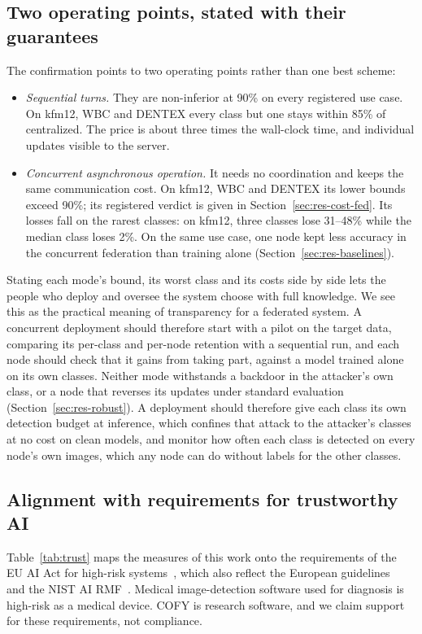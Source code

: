 \documentclass[pdflatex,sn-mathphys-num]{sn-jnl}
\newcommand{\sys}{COFY}
\begin{document}
\subsection{Two operating points, stated with their guarantees}
The confirmation points to two operating points rather than one best scheme:
\begin{itemize}
\item \emph{Sequential turns.} They are non-inferior at 90\% on every registered use case. On kfm12, WBC and DENTEX every class but one stays within 85\% of centralized. The price is about three times the wall-clock time, and individual updates visible to the server.
\item \emph{Concurrent asynchronous operation.} It needs no coordination and keeps the same communication cost. On kfm12, WBC and DENTEX its lower bounds exceed 90\%; its registered verdict is given in Section~\ref{sec:res-cost-fed}. Its losses fall on the rarest classes: on kfm12, three classes lose 31--48\% while the median class loses 2\%. On the same use case, one node kept less accuracy in the concurrent federation than training alone (Section~\ref{sec:res-baselines}).
\end{itemize}
Stating each mode's bound, its worst class and its costs side by side lets the people who deploy and oversee the system choose with full knowledge. We see this as the practical meaning of transparency for a federated system. A concurrent deployment should therefore start with a pilot on the target data, comparing its per-class and per-node retention with a sequential run, and each node should check that it gains from taking part, against a model trained alone on its own classes. Neither mode withstands a backdoor in the attacker's own class, or a node that reverses its updates under standard evaluation (Section~\ref{sec:res-robust}). A deployment should therefore give each class its own detection budget at inference, which confines that attack to the attacker's classes at no cost on clean models, and monitor how often each class is detected on every node's own images, which any node can do without labels for the other classes.

\subsection{Alignment with requirements for trustworthy AI}
Table~\ref{tab:trust} maps the measures of this work onto the requirements of the EU AI Act for high-risk systems~\cite{euaiact2024}, which also reflect the European guidelines~\cite{hleg2019ethics} and the NIST AI RMF~\cite{nist2023rmf}. Medical image-detection software used for diagnosis is high-risk as a medical device. \sys{} is research software, and we claim support for these requirements, not compliance.
\end{document}
